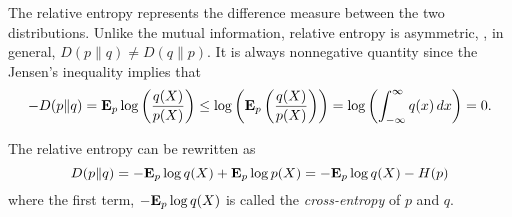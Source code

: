 The relative entropy represents the difference measure between the two distributions.
Unlike the mutual information, relative entropy is asymmetric, \ie,
in general, $D(p\|q) \neq D(q\|p)$.
It is always nonnegative quantity since the Jensen's inequality implies that
\begin{equation}
-D(p\|q) = {\bf E{}}_p \log\left(\frac{q(X)}{p(X)}\right)
\leq \log\left({\bf E{}}_p \left(\frac{q(X)}{p(X)}\right)\right)
= \log\left(\int_{-\infty}^\infty q(x)\, dx \right) = 0.
\end{equation}

The relative entropy can be rewritten as
\begin{equation}
D(p\|q) = -{\bf E{}}_p \log q(X) + {\bf E{}}_p \log p(X)
= -{\bf E{}}_p \log q(X) - H(p)
\end{equation}
where the first term, $-{\bf E{}}_p \log q(X)$ is called the \emph{cross-entropy} of $p$ and $q$.


